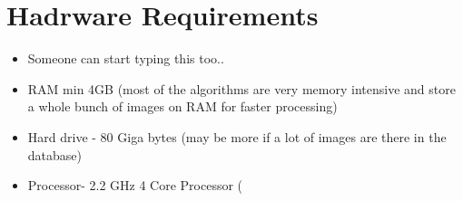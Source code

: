 \section{Hadrware Requirements}
\begin{itemize}

\item Someone can start typing this too..
\item RAM min 4GB (most of the algorithms are very memory intensive and store a whole bunch of images on RAM for faster processing)
\item Hard drive - 80 Giga bytes (may be more if a lot of images are there in the database)
\item Processor- 2.2 GHz 4 Core Processor (
\end{itemize}

